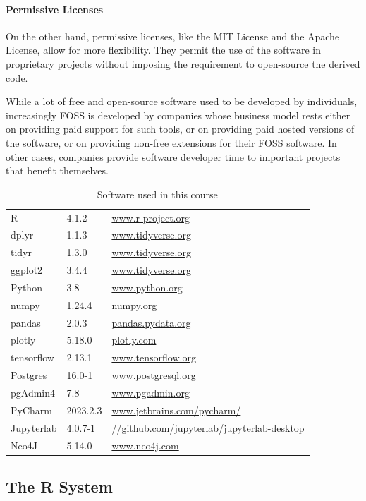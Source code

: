 \paragraph*{Permissive Licenses} On the other hand, permissive licenses, like the MIT License and the Apache License, allow for more flexibility. They permit the use of the software in proprietary projects without imposing the requirement to open-source the derived code.

While a lot of free and open-source software used to be developed by individuals, increasingly FOSS is developed by companies whose business model rests either on providing paid support for such tools, or on providing paid hosted versions of the software, or on providing non-free extensions for their FOSS software. In other cases, companies provide software developer time to important projects that benefit themselves.

\begin{table}
\small
\centering

\begin{tabular}{l|l|l} \hline
R & 4.1.2 & \url{www.r-project.org}\\ 
dplyr & 1.1.3 & \url{www.tidyverse.org} \\
tidyr & 1.3.0 & \url{www.tidyverse.org} \\
ggplot2 & 3.4.4 & \url{www.tidyverse.org} \\
Python & 3.8 & \url{www.python.org} \\
numpy & 1.24.4 & \url{numpy.org} \\
pandas & 2.0.3 & \url{pandas.pydata.org} \\
plotly & 5.18.0 & \url{plotly.com} \\ 
tensorflow & 2.13.1 & \url{www.tensorflow.org} \\
Postgres & 16.0-1 & \url{www.postgresql.org} \\
pgAdmin4 & 7.8 & \url{www.pgadmin.org} \\
PyCharm & 2023.2.3 & \url{www.jetbrains.com/pycharm/} \\
Jupyterlab & 4.0.7-1 & \url{//github.com/jupyterlab/jupyterlab-desktop} \\
Neo4J & 5.14.0 & \url{www.neo4j.com} \\ \hline
\end{tabular}
\caption[Software used in this book]{Software used in this course}
\label{tab:software}
\end{table}

\subsection*{The R System}

